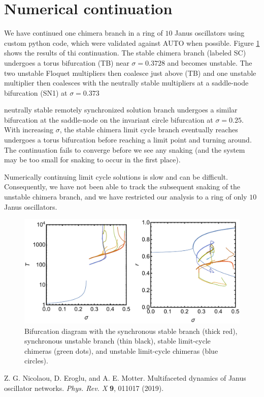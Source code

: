 \documentclass[aps,pre,amsmath,amssymb,floatfix,onecolumn,notitlepage,10pt]{revtex4-1}
\begin{document}
\section{Numerical continuation}
We have continued one chimera branch in a ring of $10$ Janus oscillators using custom python code, which were validated against AUTO when possible. Figure \ref{fig1} shows the results of thi continuation. The stable chimera branch (labeled SC) undergoes a torus bifurcation (TB) near $\sigma = 0.3728$ and becomes unstable. The two unstable Floquet multipliers then coalesce just above (TB) and one unstable multiplier then coalesces with the neutrally stable multipliers at a saddle-node bifurcation (SN1) at $\sigma =0.373$


 neutrally stable remotely synchronized solution branch undergoes a similar bifurcation at the saddle-node on the invariant circle bifurcation at $\sigma=0.25$.  With increasing $\sigma$, the stable chimera limit cycle branch eventually reaches undergoes a torus bifurcation before reaching a limit point and turning around. The continuation fails to converge before we see any snaking (and the system may be too small for snaking to occur in the first place).

Numerically continuing limit cycle solutions is slow and can be difficult.  Consequently, we have not been able to track the subsequent snaking of the unstable chimera branch, and we have restricted our analysis to a ring of only $10$ Janus oscillators.
\begin{figure}[hb]
\includegraphics[width=\columnwidth]{diagram.pdf}
\caption{Bifurcation diagram with the synchronous stable branch (thick red), synchronous unstable branch (thin black), stable limit-cycle chimeras (green dots), and unstable limit-cycle chimeras (blue circles). \label{fig1}}
\end{figure}
\begin{thebibliography}{99}
 Z. G. Nicolaou, D. Eroglu, and A. E. Motter. Multifaceted dynamics of Janus oscillator networks. \textit{Phys. Rev. X} \textbf{9}, 011017 (2019).
\end{thebibliography}
\end{document}
